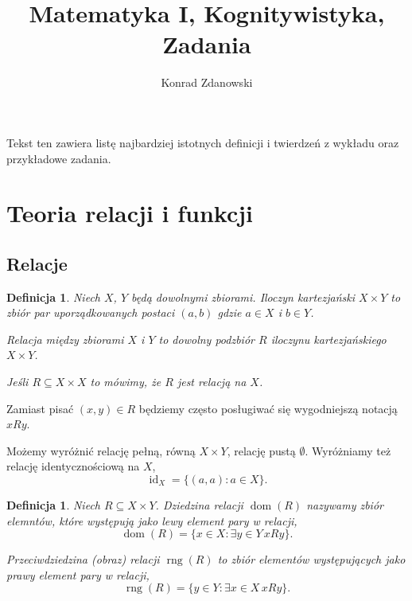 \documentclass[12pt]{article}
\title{Matematyka I, Kognitywistyka,\\
        Zadania}
\author{Konrad Zdanowski}
\DeclareMathOperator{\id}{id}
\newtheorem{dfn}[thm]{Definicja}
\DeclareMathOperator{\dom}{dom}
\DeclareMathOperator{\rng}{rng}
\begin{document}
\maketitle
\thispagestyle{empty}

Tekst ten zawiera listę najbardziej istotnych definicji
i twierdzeń z wykładu oraz przykładowe zadania.

\section{Teoria relacji i funkcji}
\subsection{Relacje}

\begin{dfn}
	Niech $X$, $Y$ będą dowolnymi zbiorami. Iloczyn kartezjański $X\times Y$ 
	to zbiór par uporządkowanych postaci $(a,b)$ gdzie $a\in X$ i $b\in Y$.
	
	Relacja między zbiorami $X$ i $Y$ to dowolny podzbiór $R$
	iloczynu kartezjańskiego $X\times Y$.
	
	Jeśli $R\subseteq X\times X$ to mówimy, że $R$ jest relacją na $X$.
\end{dfn}

Zamiast pisać $(x,y)\in R$ będziemy często posługiwać się 
wygodniejszą notacją $xRy$.


Możemy wyróżnić relację pełną, równą $X\times Y$, relację pustą $\emptyset$.
Wyróżniamy też relację identycznościową na $X$, 
$$
\id_X= \{(a,a)\colon a\in X\}.
$$ 

\begin{dfn}
	Niech $R\subseteq X\times Y$.
	Dziedzina relacji $\dom(R)$ nazywamy zbiór elemntów, które występują jako lewy
	element pary w  relacji,
	\[ \dom(R)= \{ x\in X\colon \exists y\in Y\, xRy\}.
	\]
	
	Przeciwdziedzina (obraz) relacji $\rng(R)$ to zbiór elementów występujących jako prawy element pary w relacji,
	\[ \rng(R) = \{ y\in Y \colon \exists x\in X\, xRy\}.\]
\end{dfn}
\end{document}

